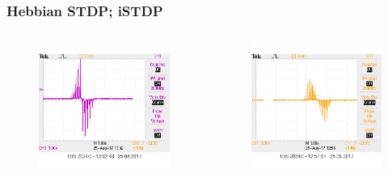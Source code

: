 \documentclass[12pt, aspectratio=169]{beamer}
\begin{document}
\begin{frame}
\frametitle{Hebbian STDP; iSTDP}
\begin{columns}[c] %

\begin{figure}
\includegraphics[width=1\linewidth]{hebb_output_single}
\end{figure}
\begin{figure}
\includegraphics[width=1\linewidth]{inh_output_single}
\end{figure}
\end{columns}
\end{frame}
\end{document}
